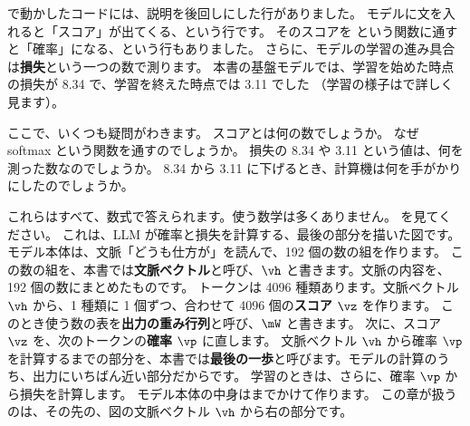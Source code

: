 で動かしたコードには、説明を後回しにした行がありました。
モデルに文を入れると「スコア」が出てくる、という行です。
そのスコアを  という関数に通すと「確率」になる、という行もありました。
さらに、モデルの学習の進み具合は\textbf{損失}という一つの数で測ります。
本書の基盤モデルでは、学習を始めた時点の損失が 8.34 で、学習を終えた時点では 3.11 でした
（学習の様子はで詳しく見ます）。

ここで、いくつも疑問がわきます。
スコアとは何の数でしょうか。
なぜ softmax という関数を通すのでしょうか。
損失の 8.34 や 3.11 という値は、何を測った数なのでしょうか。
8.34 から 3.11 に下げるとき、計算機は何を手がかりにしたのでしょうか。

これらはすべて、数式で答えられます。使う数学は多くありません。
を見てください。
これは、LLM が確率と損失を計算する、最後の部分を描いた図です。
モデル本体は、文脈「どうも仕方が」を読んで、192 個の数の組を作ります。
この数の組を、本書では\textbf{文脈ベクトル}と呼び、$\vh$ と書きます。文脈の内容を、192 個の数にまとめたものです。
トークンは 4096 種類あります。文脈ベクトル $\vh$ から、1 種類に 1 個ずつ、合わせて 4096 個の\textbf{スコア} $\vz$ を作ります。
このとき使う数の表を\textbf{出力の重み行列}と呼び、$\mW$ と書きます。
次に、スコア $\vz$ を、次のトークンの\textbf{確率} $\vp$ に直します。
文脈ベクトル $\vh$ から確率 $\vp$ を計算するまでの部分を、本書では\textbf{最後の一歩}と呼びます。モデルの計算のうち、出力にいちばん近い部分だからです。
学習のときは、さらに、確率 $\vp$ から損失を計算します。
モデル本体の中身はまでかけて作ります。
この章が扱うのは、その先の、図の文脈ベクトル $\vh$ から右の部分です。

